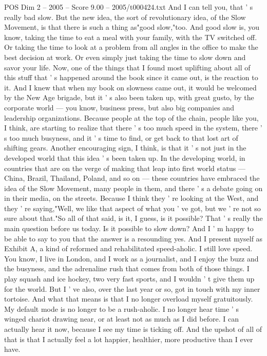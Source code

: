 \begin{textsample}{POS Dim 2 – 2005 – Score 9.00 – 2005/t000424.txt}
And I can tell you, that ' s really bad slow.
But the new idea, the sort of revolutionary idea, of the Slow Movement, is that there is such a thing as"good slow,"too.
And good slow is, you know, taking the time to eat a meal with your family, with the TV switched off.
Or taking the time to look at a problem from all angles in the office to make the best decision at work.
Or even simply just taking the time to slow down and savor your life.
Now, one of the things that I found most uplifting about all of this stuff that ' s happened around the book since it came out, is the reaction to it.
And I knew that when my book on slowness came out, it would be welcomed by the New Age brigade, but it ' s also been taken up, with great gusto, by the corporate world — you know, business press, but also big companies and leadership organizations.
Because people at the top of the chain, people like you, I think, are starting to realize that there ' s too much speed in the system, there ' s too much busyness, and it ' s time to find, or get back to that lost art of shifting gears.
Another encouraging sign, I think, is that it ' s not just in the developed world that this idea ' s been taken up.
In the developing world, in countries that are on the verge of making that leap into first world status — China, Brazil, Thailand, Poland, and so on — these countries have embraced the idea of the Slow Movement, many people in them, and there ' s a debate going on in their media, on the streets.
Because I think they ' re looking at the West, and they ' re saying,"Well, we like that aspect of what you ' ve got, but we ' re not so sure about that."So all of that said, is it, I guess, is it possible?
That ' s really the main question before us today.
Is it possible to slow down?
And I ' m happy to be able to say to you that the answer is a resounding yes.
And I present myself as Exhibit A, a kind of reformed and rehabilitated speed-aholic.
I still love speed.
You know, I live in London, and I work as a journalist, and I enjoy the buzz and the busyness, and the adrenaline rush that comes from both of those things.
I play squash and ice hockey, two very fast sports, and I wouldn ' t give them up for the world.
But I ' ve also, over the last year or so, got in touch with my inner tortoise.
And what that means is that I no longer overload myself gratuitously.
My default mode is no longer to be a rush-aholic.
I no longer hear time ' s winged chariot drawing near, or at least not as much as I did before.
I can actually hear it now, because I see my time is ticking off.
And the upshot of all of that is that I actually feel a lot happier, healthier, more productive than I ever have.

\end{textsample}
